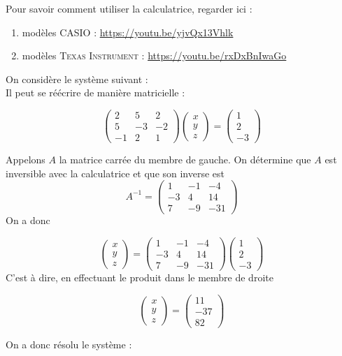 \documentclass[a4paper,12pt]{book}
\begin{document}
\begin{remarque}[]
Pour savoir comment utiliser la calculatrice, regarder ici :
\begin{enumerate}[--]
	\item 	modèles \textsc{CASIO} : \url{https://youtu.be/yjvQx13Vhlk}
	\item 	modèles \textsc{Texas Instrument} : \url{https://youtu.be/rxDxBnIwaGo}
\end{enumerate}
\end{remarque}

\begin{exemple}[]
On considère le système suivant : \\

Il peut se réécrire de manière matricielle :

$$\begin{pmatrix}
2 & 5 & 2 \\
5 & -3 & -2\\
-1 & 2 & 1
\end{pmatrix}
\begin{pmatrix}
x \\ y \\ z
\end{pmatrix}=
\begin{pmatrix}
1 \\ 2 \\ -3
\end{pmatrix}$$

Appelons $A$ la matrice carrée du membre de gauche. On détermine que $A$ est inversible avec la calculatrice et que son inverse est 
$$A^{-1}=\begin{pmatrix}
1 & -1 & -4 \\
-3 & 4 & 14\\
7 & -9 & -31
\end{pmatrix}$$
On a donc

$$\begin{pmatrix}
x \\ y \\ z
\end{pmatrix}=\begin{pmatrix}
1 & -1 & -4 \\
-3 & 4 & 14\\
7 & -9 & -31
\end{pmatrix}\begin{pmatrix}
1 \\ 2 \\ -3
\end{pmatrix}$$
C'est à dire, en effectuant le produit dans le membre de droite 

$$\begin{pmatrix}
x \\ y \\ z
\end{pmatrix}=\begin{pmatrix}
11\\-37\\82
\end{pmatrix}$$

On a donc résolu le système : 
\end{exemple}
\end{document}
